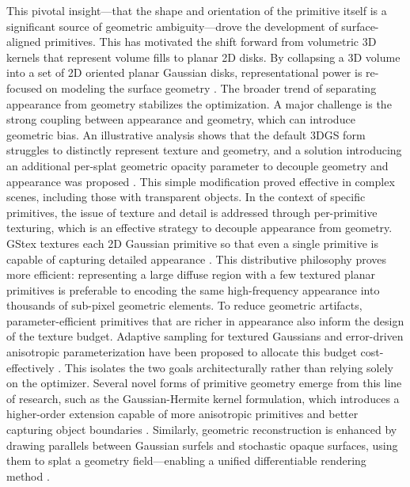 \documentclass[11pt,a4paper]{article}
\begin{document}
This pivotal insight---that the shape and orientation of the primitive itself is a significant source of geometric ambiguity---drove the development of surface-aligned primitives. This has motivated the shift forward from volumetric 3D kernels that represent volume fills to planar 2D disks. By collapsing a 3D volume into a set of 2D oriented planar Gaussian disks, representational power is re-focused on modeling the surface geometry \cite{arxiv:2403.17888v1}. The broader trend of separating appearance from geometry stabilizes the optimization. A major challenge is the strong coupling between appearance and geometry, which can introduce geometric bias. An illustrative analysis shows that the default 3DGS form struggles to distinctly represent texture and geometry, and a solution introducing an additional per-splat geometric opacity parameter to decouple geometry and appearance was proposed \cite{arxiv:2606.05124v1}. This simple modification proved effective in complex scenes, including those with transparent objects. In the context of specific primitives, the issue of texture and detail is addressed through per-primitive texturing, which is an effective strategy to decouple appearance from geometry. GStex textures each 2D Gaussian primitive so that even a single primitive is capable of capturing detailed appearance \cite{arxiv:2409.12954v1}. This distributive philosophy proves more efficient: representing a large diffuse region with a few textured planar primitives is preferable to encoding the same high-frequency appearance into thousands of sub-pixel geometric elements. To reduce geometric artifacts, parameter-efficient primitives that are richer in appearance also inform the design of the texture budget. Adaptive sampling for textured Gaussians and error-driven anisotropic parameterization have been proposed to allocate this budget cost-effectively \cite{arxiv:2512.14039v1}. This isolates the two goals architecturally rather than relying solely on the optimizer. Several novel forms of primitive geometry emerge from this line of research, such as the Gaussian-Hermite kernel formulation, which introduces a higher-order extension capable of more anisotropic primitives and better capturing object boundaries \cite{arxiv:2408.16982v1}. Similarly, geometric reconstruction is enhanced by drawing parallels between Gaussian surfels and stochastic opaque surfaces, using them to splat a geometry field---enabling a unified differentiable rendering method \cite{arxiv:2411.17067v2}.
\end{document}
